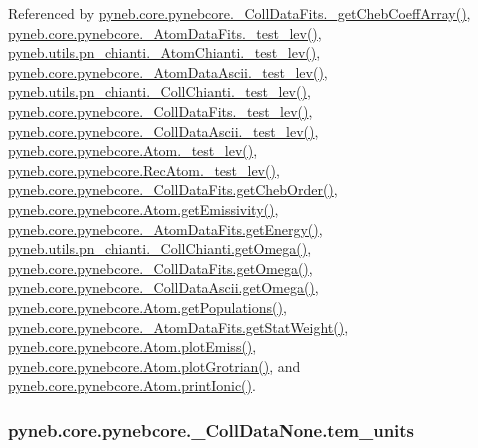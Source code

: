Referenced by \hyperlink{pynebcore_8py_source_l00751}{pyneb.\-core.\-pynebcore.\-\_\-\-Coll\-Data\-Fits.\-\_\-get\-Cheb\-Coeff\-Array()}, \hyperlink{pynebcore_8py_source_l00178}{pyneb.\-core.\-pynebcore.\-\_\-\-Atom\-Data\-Fits.\-\_\-test\-\_\-lev()}, \hyperlink{pn__chianti_8py_source_l00304}{pyneb.\-utils.\-pn\-\_\-chianti.\-\_\-\-Atom\-Chianti.\-\_\-test\-\_\-lev()}, \hyperlink{pynebcore_8py_source_l00447}{pyneb.\-core.\-pynebcore.\-\_\-\-Atom\-Data\-Ascii.\-\_\-test\-\_\-lev()}, \hyperlink{pn__chianti_8py_source_l00472}{pyneb.\-utils.\-pn\-\_\-chianti.\-\_\-\-Coll\-Chianti.\-\_\-test\-\_\-lev()}, \hyperlink{pynebcore_8py_source_l00677}{pyneb.\-core.\-pynebcore.\-\_\-\-Coll\-Data\-Fits.\-\_\-test\-\_\-lev()}, \hyperlink{pynebcore_8py_source_l01045}{pyneb.\-core.\-pynebcore.\-\_\-\-Coll\-Data\-Ascii.\-\_\-test\-\_\-lev()}, \hyperlink{pynebcore_8py_source_l01525}{pyneb.\-core.\-pynebcore.\-Atom.\-\_\-test\-\_\-lev()}, \hyperlink{pynebcore_8py_source_l02672}{pyneb.\-core.\-pynebcore.\-Rec\-Atom.\-\_\-test\-\_\-lev()}, \hyperlink{pynebcore_8py_source_l00711}{pyneb.\-core.\-pynebcore.\-\_\-\-Coll\-Data\-Fits.\-get\-Cheb\-Order()}, \hyperlink{pynebcore_8py_source_l01782}{pyneb.\-core.\-pynebcore.\-Atom.\-get\-Emissivity()}, \hyperlink{pynebcore_8py_source_l00275}{pyneb.\-core.\-pynebcore.\-\_\-\-Atom\-Data\-Fits.\-get\-Energy()}, \hyperlink{pn__chianti_8py_source_l00507}{pyneb.\-utils.\-pn\-\_\-chianti.\-\_\-\-Coll\-Chianti.\-get\-Omega()}, \hyperlink{pynebcore_8py_source_l00828}{pyneb.\-core.\-pynebcore.\-\_\-\-Coll\-Data\-Fits.\-get\-Omega()}, \hyperlink{pynebcore_8py_source_l01082}{pyneb.\-core.\-pynebcore.\-\_\-\-Coll\-Data\-Ascii.\-get\-Omega()}, \hyperlink{pynebcore_8py_source_l01562}{pyneb.\-core.\-pynebcore.\-Atom.\-get\-Populations()}, \hyperlink{pynebcore_8py_source_l00249}{pyneb.\-core.\-pynebcore.\-\_\-\-Atom\-Data\-Fits.\-get\-Stat\-Weight()}, \hyperlink{pynebcore_8py_source_l02384}{pyneb.\-core.\-pynebcore.\-Atom.\-plot\-Emiss()}, \hyperlink{pynebcore_8py_source_l02443}{pyneb.\-core.\-pynebcore.\-Atom.\-plot\-Grotrian()}, and \hyperlink{pynebcore_8py_source_l02233}{pyneb.\-core.\-pynebcore.\-Atom.\-print\-Ionic()}.

\hypertarget{classpyneb_1_1core_1_1pynebcore_1_1___coll_data_none_afc8b4905545401491edcb56c8f0b556e}{
\subsubsection[{tem\-\_\-units}]{\setlength{\rightskip}{0pt plus 5cm}pyneb.\-core.\-pynebcore.\-\_\-\-Coll\-Data\-None.\-tem\-\_\-units}}\label{classpyneb_1_1core_1_1pynebcore_1_1___coll_data_none_afc8b4905545401491edcb56c8f0b556e}


